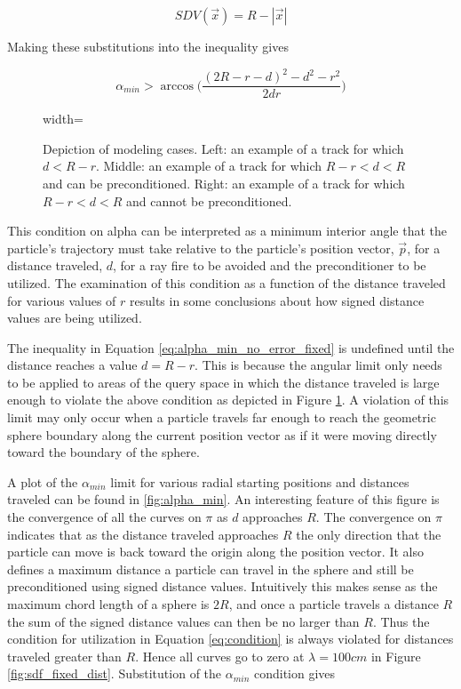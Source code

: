 \begin{equation}
  SDV(\vec{x}) =  R-|\vec{x}|
  \label{eq:sdf_sphere}
\end{equation}

Making these substitutions into the inequality gives

\begin{equation}
  \alpha_{min} > \arccos\Bigg ( \frac{(2R-r-d)^2-d^2-r^2}{2 d r} \Bigg )
  \label{eq:alpha_min_no_error_fixed}
\end{equation}

\begin{figure}[ht]
  \centering
  {width=\textwidth}
  \caption{Depiction of modeling cases. Left: an example of a track for which
    $d < R - r$. Middle: an example of a track for which $R-r < d < R$ and can be
    preconditioned.  Right: an example of a track for which $R-r < d < R$ and
    cannot be preconditioned.}
  \label{fig:modeling_cases}
\end{figure}

This condition on alpha can be interpreted as a minimum interior angle that the
particle's trajectory must take relative to the particle's position vector,
$\vec{p}$, for a distance traveled, $d$, for a ray fire to be avoided and the
preconditioner to be utilized. The examination of this condition as a function
of the distance traveled for various values of $r$ results in some conclusions
about how signed distance values are being utilized.

The inequality in Equation \ref{eq:alpha_min_no_error_fixed} is undefined until the distance reaches a value $d = R- r$. This
is because the angular limit only needs to be applied to areas of the query
space in which the distance traveled is large enough to violate the above
condition as depicted in  Figure \ref{fig:modeling_cases}. A violation of this
limit may only occur when a particle travels far enough to reach the geometric
sphere boundary along the current position vector as if it were moving directly
toward the boundary of the sphere.

A plot of the $\alpha_{min}$ limit for various radial starting positions and
distances traveled can be found in \ref{fig:alpha_min}. An interesting feature
of this figure is the convergence of all the curves on $\pi$ as $d$ approaches
$R$. The convergence on $\pi$ indicates that as the distance traveled approaches
$R$ the only direction that the particle can move is back toward the origin
along the position vector. It also defines a maximum distance a particle can
travel in the sphere and still be preconditioned using signed distance
values. Intuitively this makes sense as the maximum chord length of a sphere is
$2R$, and once a particle travels a distance $R$ the sum of the signed distance
values can then be no larger than $R$. Thus the condition for utilization in
Equation \ref{eq:condition} is always violated for distances traveled greater
than $R$. Hence all curves go to zero at $\lambda
= 100 cm$ in Figure \ref{fig:sdf_fixed_dist}. Substitution of the $\alpha_{min}$
condition gives

